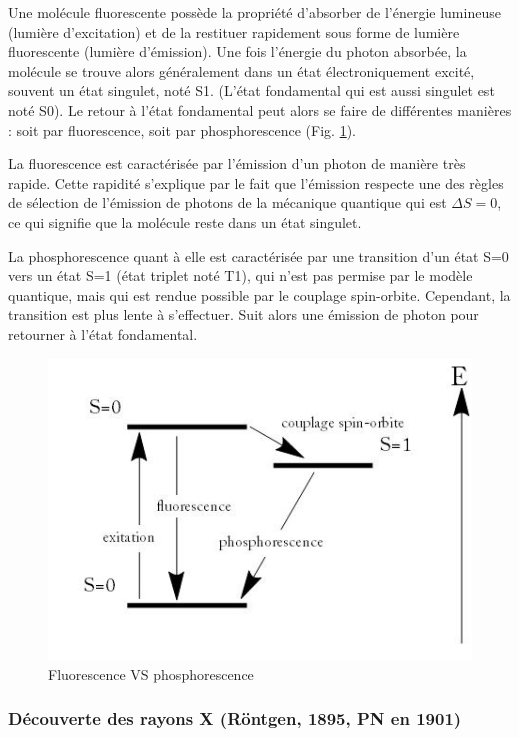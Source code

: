 Une molécule fluorescente possède la propriété d'absorber de l'énergie lumineuse (lumière d'excitation) et de la restituer rapidement sous forme de lumière fluorescente (lumière d'émission). Une fois l'énergie du photon absorbée, la molécule se trouve alors généralement dans un état électroniquement excité, souvent un état singulet, noté S1. (L'état fondamental qui est aussi singulet est noté S0). Le retour à l'état fondamental peut alors se faire de différentes manières : soit par fluorescence, soit par phosphorescence (Fig. \ref{fig:fluorescence_phosphorescence}).

La fluorescence est caractérisée par l'émission d'un photon de manière très rapide. Cette rapidité s'explique par le fait que l'émission respecte une des règles de sélection de l'émission de photons de la mécanique quantique qui est $\Delta S=0$, ce qui signifie que la molécule reste dans un état singulet.

La phosphorescence quant à elle est caractérisée par une transition d'un état S=0 vers un état S=1 (état triplet noté T1), qui n'est pas permise par le modèle quantique, mais qui est rendue possible par le couplage spin-orbite. Cependant, la transition est plus lente à s'effectuer. Suit alors une émission de photon pour retourner à l'état fondamental. 

\begin{figure}[ht]
    \centering
    \includegraphics[scale=0.65]{Images1/fluophospho.jpg}
    \caption{Fluorescence VS phosphorescence}
    \label{fig:fluorescence_phosphorescence}
\end{figure}


\subsubsection{Découverte des rayons X (Röntgen, 1895, PN en 1901)}

